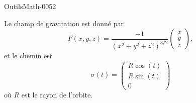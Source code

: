 
\begin{corrige}{OutilsMath-0052}

    Le champ de gravitation est donné par
    \begin{equation}
        F(x,y,z)=\frac{-1}{ (x^2+y^2+z^2)^{3/2} }\begin{pmatrix}
            x    \\ 
            y    \\ 
            z    
        \end{pmatrix},
    \end{equation}
    et le chemin est
    \begin{equation}
        \sigma(t)=\begin{pmatrix}
            R\cos(t)    \\ 
            R\sin(t)    \\ 
            0    
        \end{pmatrix}
    \end{equation}
    où $R$ est le rayon de l'orbite.


\end{corrige}
